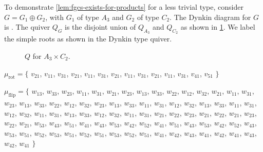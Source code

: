 \documentclass{amsart}
\theoremstyle{plain}
\theoremstyle{definition}
\theoremstyle{remark}
\newcommand{\muflip}{{\mu_{\text{flip}}}}
\newcommand{\murot}{{\mu_{\text{rot}}}}
\newlength\inlmutseqhang
\newcommand{\inlmutseq}[2]{%
  {\small%
    \settowidth\inlmutseqhang{$#1 = \big\{~$~}%
    \hangindent\inlmutseqhang%
    \noindent $#1 = \big\{$ #2 $\big\}$\par}%
}
\newcommand{\inldynkinAthreeCtwo}{\raisebox{-0.7ex}{}}
\begin{document}
  To demonstrate \cref{lem:fgcs-exists-for-products} for a less trivial
  type, consider $G = G_1 \oplus G_2$, with $G_1$ of type $A_3$ and
  $G_2$ of type $C_2$. The Dynkin diagram for $G$ is
  \inldynkinAthreeCtwo. The quiver $Q_G$ is the disjoint union of
  $Q_{A_3}$ and $Q_{C_2}$ as shown in \cref{fig:QA3-C2}. We label the
  simple roots as shown in the Dynkin type quiver.

  {\centering 

  }

  \begin{figure}
    \centering 

    \caption{$Q$ for $A_3 \times C_2$.
      \label{fig:QA3-C2}
    }
  \end{figure}

  \inlmutseq{\murot}{ $v_{2 1}$, $v_{1 1}$, $v_{3 1}$, $v_{2 1}$, $v_{1
      1}$, $v_{3 1}$, $v_{2 1}$, $v_{1 1}$, $v_{3 1}$, $v_{2 1}$, $v_{1
      1}$, $v_{3 1}$, \qquad $v_{4 1}$, $v_{5 1}$ }

  \inlmutseq{\muflip}{ $w_{1 3}$, $w_{3 3}$, $w_{2 3}$, $w_{1 1}$, $w_{3
      1}$, $w_{2 1}$, $w_{2 3}$, $w_{1 3}$, $w_{3 3}$, $w_{2 2}$, $w_{1
      2}$, $w_{3 2}$, $w_{2 1}$, $w_{1 1}$, $w_{3 1}$, $w_{2 3}$, $w_{1
      3}$, $w_{3 3}$, $w_{2 2}$, $w_{1 2}$, $w_{3 2}$, $w_{2 3}$, $w_{1
      3}$, $w_{3 3}$, $w_{1 1}$, $w_{3 1}$, $w_{1 2}$, $w_{3 2}$, $w_{1
      3}$, $w_{3 3}$, $w_{1 1}$, $w_{3 1}$, $w_{1 2}$, $w_{3 2}$, $w_{1
      1}$, $w_{3 1}$, $w_{1 3}$, $w_{3 3}$, $w_{1 2}$, $w_{3 2}$, $w_{1
      1}$, $w_{3 1}$, $w_{2 1}$, $w_{2 2}$, $w_{2 3}$, $w_{2 1}$, $w_{2
      2}$, $w_{2 1}$, $w_{2 3}$, $w_{2 2}$, $w_{2 1}$, \qquad $w_{5 3}$,
    $w_{4 3}$, $w_{5 1}$, $w_{4 1}$, $w_{4 3}$, $w_{5 3}$, $w_{4 2}$,
    $w_{5 2}$, $w_{4 1}$, $w_{5 1}$, $w_{4 3}$, $w_{5 3}$, $w_{4 2}$,
    $w_{5 2}$, $w_{4 3}$, $w_{5 3}$, $w_{5 1}$, $w_{5 2}$, $w_{5 3}$,
    $w_{5 1}$, $w_{5 2}$, $w_{5 1}$, $w_{5 3}$, $w_{5 2}$, $w_{5 1}$,
    $w_{4 1}$, $w_{4 2}$, $w_{4 3}$, $w_{4 1}$, $w_{4 2}$, $w_{4 1}$,
    $w_{4 3}$, $w_{4 2}$, $w_{4 1}$ }
\end{document}
